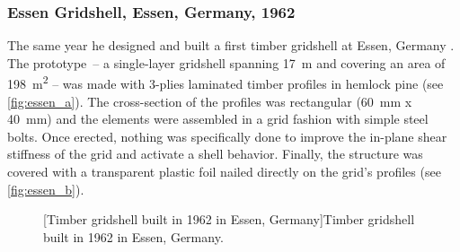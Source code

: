 \subsubsection{Essen Gridshell, Essen, Germany, 1962}
The same year he designed and built a first timber gridshell at Essen, Germany \cite[p.~272]{IL10}. The prototype~-- a single-layer gridshell spanning \SI{17}{m} and covering an area of \SI{198}{m^2} -- was made with 3-plies laminated timber profiles in hemlock pine (see \cref{fig:essen_a}). The cross-section of the profiles was rectangular (\SI{60}{mm} x \SI{40}{mm}) and the elements were assembled in a grid fashion with simple steel bolts. Once erected, nothing was specifically done to improve the in-plane shear stiffness of the grid and activate a shell behavior. Finally, the structure was covered with a transparent plastic foil nailed directly on the grid's profiles (see \cref{fig:essen_b}).
\begin{figure}[t]
		\hspace*{\fill}
		\vspace{10pt}
		[Timber gridshell built in 1962 in Essen, Germany]{Timber gridshell built in 1962 in Essen, Germany.}
		\label{fig:essen}    
\end{figure}

